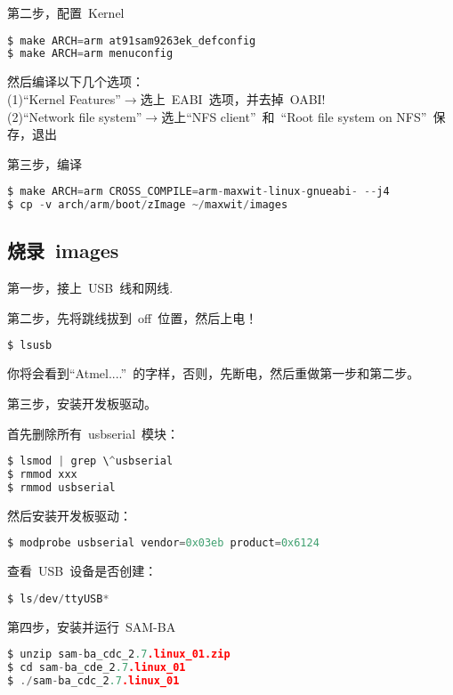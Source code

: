 \documentclass[a4paper,11pt]{article}
\begin{document}
\begin{CJK*}{UTF8}{gbsn}
第二步，配置~Kernel

\begin{lstlisting}[language=c,numbers=none]
$ make ARCH=arm at91sam9263ek_defconfig
$ make ARCH=arm menuconfig
\end{lstlisting}

然后编译以下几个选项：\\
(1)``Kernel Features''$\rightarrow$选上~EABI~选项，并去掉~OABI!~\\
(2)``Network file system''$\rightarrow$选上``NFS client''~和~``Root file system on NFS''~保存，退出

第三步，编译
\begin{lstlisting}[language=c,numbers=none]
$ make ARCH=arm CROSS_COMPILE=arm-maxwit-linux-gnueabi- --j4
$ cp -v arch/arm/boot/zImage ~/maxwit/images
\end{lstlisting}

\subsection{烧录~images~}
第一步，接上~USB~线和网线.

第二步，先将跳线拔到~off~位置，然后上电！
\begin{lstlisting}[language=c,numbers=none]
$ lsusb
\end{lstlisting}
你将会看到``Atmel....''~的字样，否则，先断电，然后重做第一步和第二步。

第三步，安装开发板驱动。

首先删除所有~usbserial~模块：

\begin{lstlisting}[language=c,numbers=none]
$ lsmod | grep \^usbserial
$ rmmod xxx
$ rmmod usbserial
\end{lstlisting}

然后安装开发板驱动：
\begin{lstlisting}[language=c,numbers=none]
$ modprobe usbserial vendor=0x03eb product=0x6124
\end{lstlisting}
查看~USB~设备是否创建：

\begin{lstlisting}[language=c,numbers=none]
$ ls/dev/ttyUSB*
\end{lstlisting}

第四步，安装并运行~SAM-BA~

\begin{lstlisting}[language=c,numbers=none]
$ unzip sam-ba_cdc_2.7.linux_01.zip
$ cd sam-ba_cde_2.7.linux_01
$ ./sam-ba_cdc_2.7.linux_01
\end{lstlisting}


\end{CJK*}
\end{document}
